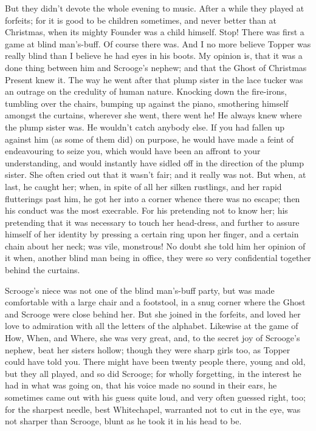 
But they didn't devote the whole evening to music. After a while they
played at forfeits; for it is good to be children sometimes, and never
better than at Christmas, when its mighty Founder was a child himself.
Stop! There was first a game at blind man's-buff. Of course there was.
And I no more believe Topper was really blind than I believe he had eyes
in his boots. My opinion is, that it was a done thing between him and
Scrooge's nephew; and that the Ghost of Christmas Present knew it. The
way he went after that plump sister in the lace tucker was an outrage on
the credulity of human nature. Knocking down the fire-irons, tumbling
over the chairs, bumping up against the piano, smothering himself
amongst the curtains, wherever she went, there went he! He always knew
where the plump sister was. He wouldn't catch anybody else. If you had
fallen up against him (as some of them did) on purpose, he would have
made a feint of endeavouring to seize you, which would have been an
affront to your understanding, and would instantly have sidled off in
the direction of the plump sister. She often cried out that it wasn't
fair; and it really was not. But when, at last, he caught her; when, in
spite of all her silken rustlings, and her rapid flutterings past him,
he got her into a corner whence there was no escape; then his conduct
was the most execrable. For his pretending not to know her; his
pretending that it was necessary to touch her head-dress, and further to
assure himself of her identity by pressing a certain ring upon her
finger, and a certain chain about her neck; was vile, monstrous! No
doubt she told him her opinion of it when, another blind man being in
office, they were so very confidential together behind the curtains.

Scrooge's niece was not one of the blind man's-buff party, but was made
comfortable with a large chair and a footstool, in a snug corner where
the Ghost and Scrooge were close behind her. But she joined in the
forfeits, and loved her love to admiration with all the letters of the
alphabet. Likewise at the game of How, When, and Where, she was very
great, and, to the secret joy of Scrooge's nephew, beat her sisters
hollow; though they were sharp girls too, as Topper could have told you.
There might have been twenty people there, young and old, but they all
played, and so did Scrooge; for wholly forgetting, in the interest he
had in what was going on, that his voice made no sound in their ears, he
sometimes came out with his guess quite loud, and very often guessed
right, too; for the sharpest needle, best Whitechapel, warranted not to
cut in the eye, was not sharper than Scrooge, blunt as he took it in
his head to be.

